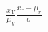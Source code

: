 \documentclass[preview]{standalone}
\begin{document}
\begin{align*}
\frac{x_V}{\mu_V} \frac{x_r - \mu_r}{\sigma}
\end{align*}
\end{document}
